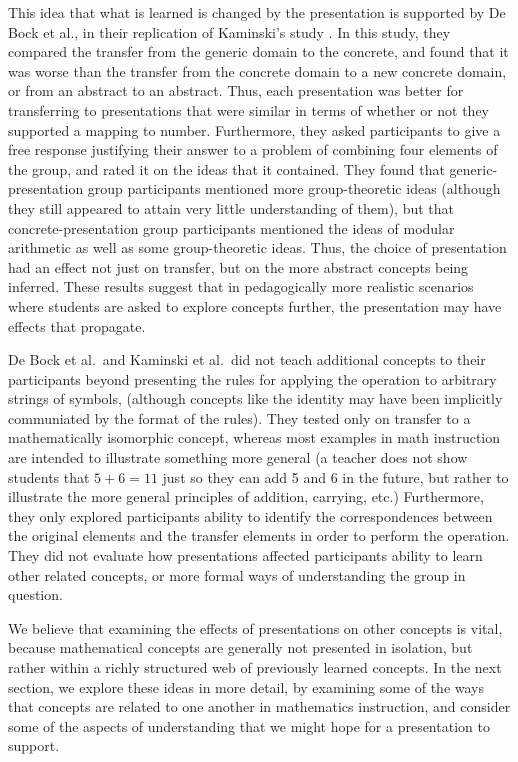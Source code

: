 \documentclass[man,mask,10pt]{apa6}
\begin{document}
This idea that what is learned is changed by the presentation is supported by De Bock et al., in their replication of Kaminski's study \cite{DeBock2011}. In this study, they compared the transfer from the generic domain to the concrete, and found that it was worse than the transfer from the concrete domain to a new concrete domain, or from an abstract to an abstract. Thus, each presentation was better for transferring to presentations that were similar in terms of whether or not they supported a mapping to number. Furthermore, they asked participants to give a free response justifying their answer to a problem of combining four elements of the group, and rated it on the ideas that it contained. They found that generic-presentation group participants mentioned more group-theoretic ideas (although they still appeared to attain very little understanding of them), but that concrete-presentation group participants mentioned the ideas of modular arithmetic as well as some group-theoretic ideas. Thus, the choice of presentation had an effect not just on transfer, but on the more abstract concepts being inferred. These results suggest that in pedagogically more realistic scenarios where students are asked to explore concepts further, the presentation may have effects that propagate. \par
De Bock et al.\ and Kaminski et al.\ did not teach additional concepts to their participants beyond presenting the rules for applying the operation to arbitrary strings of symbols, (although concepts like the identity may have been implicitly communiated by the format of the rules). They tested only on transfer to a mathematically isomorphic concept, whereas most examples in math instruction are intended to illustrate something more general (a teacher does not show students that $5+6 = 11$ just so they can add 5 and 6 in the future, but rather to illustrate the more general principles of addition, carrying, etc.) Furthermore, they only explored participants ability to identify the correspondences between the original elements and the transfer elements in order to perform the operation. They did not evaluate how presentations affected participants ability to learn other related concepts, or more formal ways of understanding the group in question.\par
We believe that examining the effects of presentations on other concepts is vital, because mathematical concepts are generally not presented in isolation, but rather within a richly structured web of previously learned concepts. In the next section, we explore these ideas in more detail, by examining some of the ways that concepts are related to one another in mathematics instruction, and consider some of the aspects of understanding that we might hope for a presentation to support. 
\end{document}
